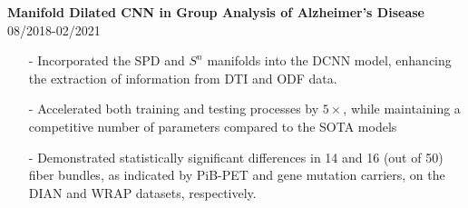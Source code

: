 \documentclass[margin]{res}
\begin{document}
\begin{resume}

                \textbf{Manifold Dilated CNN in Group Analysis of Alzheimer's Disease} \hfill 08/2018-02/2021
                \begin{itemize}\itemsep -2.2pt %
                 \item[-] Incorporated the SPD and $S^n$ manifolds into the DCNN model, enhancing the extraction of information from DTI and ODF data.
                 \item[-] Accelerated both training and testing processes by $5\times$, while maintaining a competitive number of parameters compared to the SOTA models
                 \item[-] Demonstrated statistically significant differences in 14 and 16 (out of 50) fiber bundles, as indicated by PiB-PET and gene mutation carriers, on the DIAN and WRAP datasets, respectively. 
                 \end{itemize}

\vspace{-1em}                

\end{resume}
\end{document}
